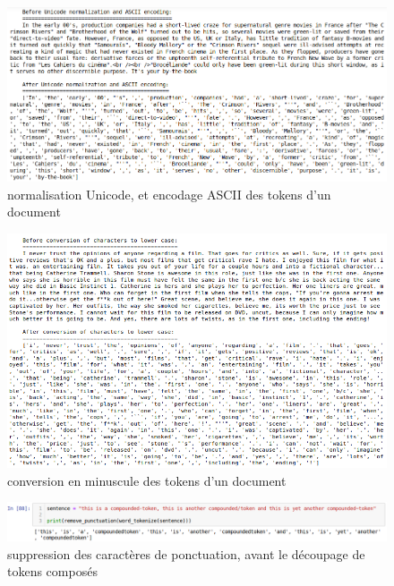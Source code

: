 \documentclass[12pt,a4paper]{report}
\theoremstyle{definition}
\begin{document}
\begin{appendices}
\begin{figure}[!ht]
  \centering
  \includegraphics[scale=0.45]{images/snapshots/preprocessing/remove_non_ascii.png}
  \caption{normalisation Unicode, et encodage ASCII des tokens d'un document}
  \label{fig:remove_non_ascii}
\end{figure}

\begin{figure}[!ht]
  \centering
  \includegraphics[scale=0.6]{images/snapshots/preprocessing/lowercase.png}
  \caption{conversion en minuscule des tokens d'un document}
  \label{fig:lowercase}
\end{figure}

\begin{figure}[!ht]
  \centering
  \includegraphics[scale=0.45]{images/snapshots/preprocessing/before_split_characterset.png}
  \caption{suppression des caractères de ponctuation, avant le découpage de tokens composés}
  \label{fig:before_split_characterset}
\end{figure}


\end{appendices}
\end{document}
